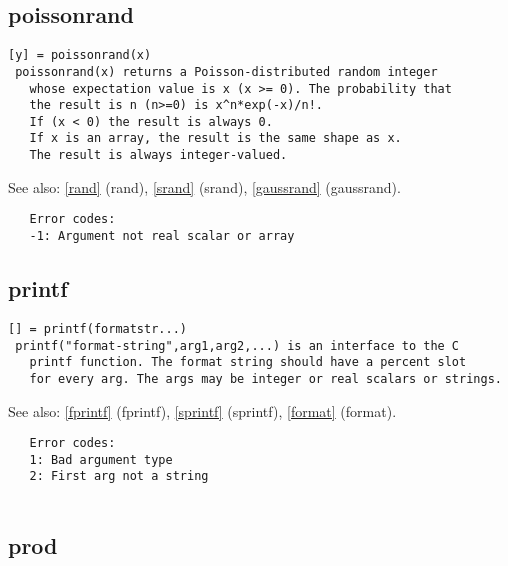 \documentclass[a4paper]{article}
\begin{document}
\subsection{poissonrand\label{poissonrand}}

\begin{tscreen}
\begin{verbatim}
[y] = poissonrand(x)
 poissonrand(x) returns a Poisson-distributed random integer
   whose expectation value is x (x >= 0). The probability that
   the result is n (n>=0) is x^n*exp(-x)/n!.
   If (x < 0) the result is always 0.
   If x is an array, the result is the same shape as x.
   The result is always integer-valued.
\end{verbatim}

See also: \ref{rand} {(rand)}, \ref{srand} {(srand)}, \ref{gaussrand} {(gaussrand)}.
\begin{verbatim}
   Error codes:
   -1: Argument not real scalar or array
\end{verbatim}
\end{tscreen}





\subsection{printf\label{printf}}

\begin{tscreen}
\begin{verbatim}
[] = printf(formatstr...)
 printf("format-string",arg1,arg2,...) is an interface to the C
   printf function. The format string should have a percent slot
   for every arg. The args may be integer or real scalars or strings.
\end{verbatim}

See also: \ref{fprintf} {(fprintf)}, \ref{sprintf} {(sprintf)}, \ref{format} {(format)}.
\begin{verbatim}
   Error codes:
   1: Bad argument type
   2: First arg not a string
   
\end{verbatim}
\end{tscreen}





\subsection{prod\label{prod}}
\end{document}
